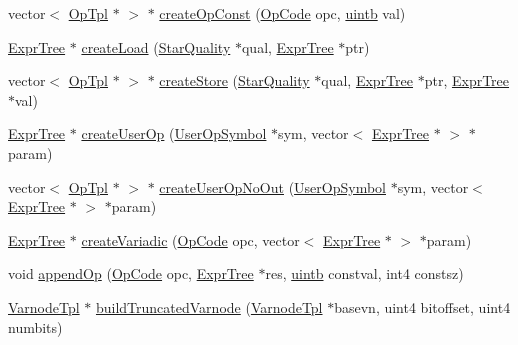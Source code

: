 \begin{DoxyCompactItemize}
\item 
vector$<$ \mbox{\hyperlink{class_op_tpl}{Op\+Tpl}} $\ast$ $>$ $\ast$ \mbox{\hyperlink{class_pcode_compile_a7579aea93806ec664ec710caa1c7538b}{create\+Op\+Const}} (\mbox{\hyperlink{opcodes_8hh_abeb7dfb0e9e2b3114e240a405d046ea7}{Op\+Code}} opc, \mbox{\hyperlink{types_8h_a2db313c5d32a12b01d26ac9b3bca178f}{uintb}} val)
\item 
\mbox{\hyperlink{class_expr_tree}{Expr\+Tree}} $\ast$ \mbox{\hyperlink{class_pcode_compile_a1731825ce7ddacbdfacb59416a3876c1}{create\+Load}} (\mbox{\hyperlink{struct_star_quality}{Star\+Quality}} $\ast$qual, \mbox{\hyperlink{class_expr_tree}{Expr\+Tree}} $\ast$ptr)
\item 
vector$<$ \mbox{\hyperlink{class_op_tpl}{Op\+Tpl}} $\ast$ $>$ $\ast$ \mbox{\hyperlink{class_pcode_compile_a4a695c299bec6d0142fa28c988dadb5f}{create\+Store}} (\mbox{\hyperlink{struct_star_quality}{Star\+Quality}} $\ast$qual, \mbox{\hyperlink{class_expr_tree}{Expr\+Tree}} $\ast$ptr, \mbox{\hyperlink{class_expr_tree}{Expr\+Tree}} $\ast$val)
\item 
\mbox{\hyperlink{class_expr_tree}{Expr\+Tree}} $\ast$ \mbox{\hyperlink{class_pcode_compile_a7eff95e3fafefc24d8b6891dc272751a}{create\+User\+Op}} (\mbox{\hyperlink{class_user_op_symbol}{User\+Op\+Symbol}} $\ast$sym, vector$<$ \mbox{\hyperlink{class_expr_tree}{Expr\+Tree}} $\ast$ $>$ $\ast$param)
\item 
vector$<$ \mbox{\hyperlink{class_op_tpl}{Op\+Tpl}} $\ast$ $>$ $\ast$ \mbox{\hyperlink{class_pcode_compile_ac76e5f48d5549b256163fa382b979462}{create\+User\+Op\+No\+Out}} (\mbox{\hyperlink{class_user_op_symbol}{User\+Op\+Symbol}} $\ast$sym, vector$<$ \mbox{\hyperlink{class_expr_tree}{Expr\+Tree}} $\ast$ $>$ $\ast$param)
\item 
\mbox{\hyperlink{class_expr_tree}{Expr\+Tree}} $\ast$ \mbox{\hyperlink{class_pcode_compile_aef3dea1541f9dc0c120ac7f232c0e078}{create\+Variadic}} (\mbox{\hyperlink{opcodes_8hh_abeb7dfb0e9e2b3114e240a405d046ea7}{Op\+Code}} opc, vector$<$ \mbox{\hyperlink{class_expr_tree}{Expr\+Tree}} $\ast$ $>$ $\ast$param)
\item 
void \mbox{\hyperlink{class_pcode_compile_a2f916c4254dca29203c7cb530d35cae8}{append\+Op}} (\mbox{\hyperlink{opcodes_8hh_abeb7dfb0e9e2b3114e240a405d046ea7}{Op\+Code}} opc, \mbox{\hyperlink{class_expr_tree}{Expr\+Tree}} $\ast$res, \mbox{\hyperlink{types_8h_a2db313c5d32a12b01d26ac9b3bca178f}{uintb}} constval, int4 constsz)
\item 
\mbox{\hyperlink{class_varnode_tpl}{Varnode\+Tpl}} $\ast$ \mbox{\hyperlink{class_pcode_compile_ab334954dd18986dfe6623b905f540c13}{build\+Truncated\+Varnode}} (\mbox{\hyperlink{class_varnode_tpl}{Varnode\+Tpl}} $\ast$basevn, uint4 bitoffset, uint4 numbits)

\end{DoxyCompactItemize}
